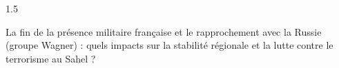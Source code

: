 \documentclass[12pt]{article}
\begin{document}
\begin{spacing}{1.5}

La fin de la présence militaire française et le rapprochement avec la Russie (groupe Wagner) : quels impacts sur la stabilité régionale et la lutte contre le terrorisme au Sahel ?

\quad
\quad

\end{spacing}
\end{document}
